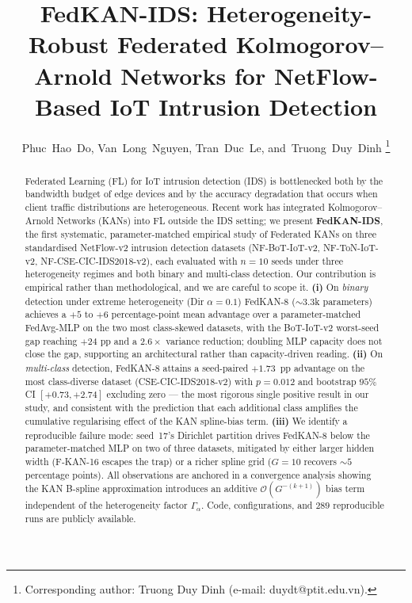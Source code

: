 \documentclass[journal]{IEEEtran}
\begin{document}
\title{FedKAN-IDS: Heterogeneity-Robust Federated Kolmogorov--Arnold Networks for NetFlow-Based IoT Intrusion Detection}

\author{
    Phuc~Hao~Do,
    Van~Long~Nguyen,
    Tran~Duc~Le,
    and~Truong~Duy~Dinh%
    \thanks{Corresponding author: Truong Duy Dinh (e-mail: duydt@ptit.edu.vn).}%
}

\maketitle

\begin{abstract}
Federated Learning (FL) for IoT intrusion detection (IDS) is bottlenecked both by the bandwidth budget of edge devices and by the accuracy degradation that occurs when client traffic distributions are heterogeneous. Recent work has integrated Kolmogorov--Arnold Networks (KANs) into FL outside the IDS setting; we present \textbf{FedKAN-IDS}, the first systematic, parameter-matched empirical study of Federated KANs on three standardised NetFlow-v2 intrusion detection datasets (NF-BoT-IoT-v2, NF-ToN-IoT-v2, NF-CSE-CIC-IDS2018-v2), each evaluated with $n = 10$ seeds under three heterogeneity regimes and both binary and multi-class detection. Our contribution is empirical rather than methodological, and we are careful to scope it. \textbf{(i)} On \emph{binary} detection under extreme heterogeneity (Dir $\alpha = 0.1$) FedKAN-8 ($\sim 3.3$k parameters) achieves a $+5$ to $+6$ percentage-point mean advantage over a parameter-matched FedAvg-MLP on the two most class-skewed datasets, with the BoT-IoT-v2 worst-seed gap reaching $+24$ pp and a $2.6\times$ variance reduction; doubling MLP capacity does not close the gap, supporting an architectural rather than capacity-driven reading. \textbf{(ii)} On \emph{multi-class} detection, FedKAN-8 attains a seed-paired $+1.73$~pp advantage on the most class-diverse dataset (CSE-CIC-IDS2018-v2) with $p = 0.012$ and bootstrap $95\%$ CI $[+0.73, +2.74]$ excluding zero --- the most rigorous single positive result in our study, and consistent with the prediction that each additional class amplifies the cumulative regularising effect of the KAN spline-bias term. \textbf{(iii)} We identify a reproducible failure mode: seed~17's Dirichlet partition drives FedKAN-8 below the parameter-matched MLP on two of three datasets, mitigated by either larger hidden width (F-KAN-16 escapes the trap) or a richer spline grid ($G\!=\!10$ recovers $\sim 5$ percentage points). All observations are anchored in a convergence analysis showing the KAN B-spline approximation introduces an additive $\mathcal{O}(G^{-(k+1)})$ bias term independent of the heterogeneity factor $\Gamma_\alpha$. Code, configurations, and $289$ reproducible runs are publicly available.
\end{abstract}
\end{document}
